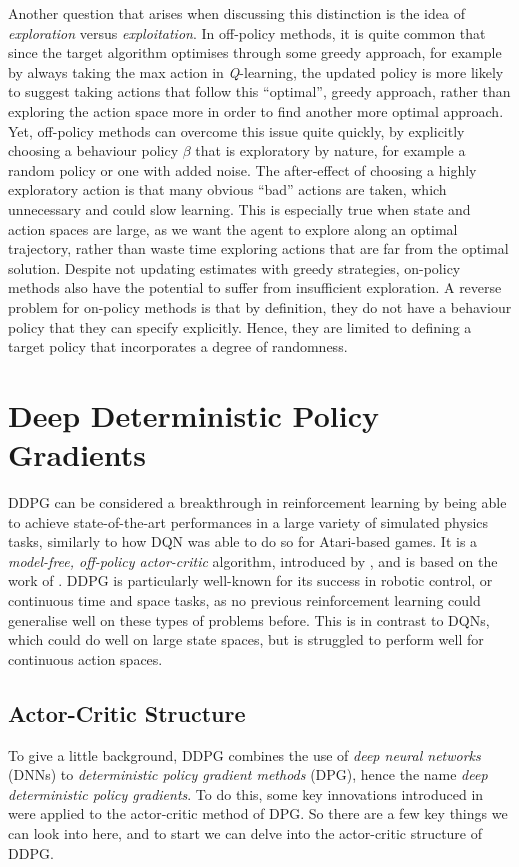 Another question that arises when discussing this distinction is the idea of \textit{exploration} versus \textit{exploitation}. In off-policy methods, it is quite common that since the target algorithm optimises through some greedy approach, for example by always taking the max action in \textit{Q}-learning, the updated policy is more likely to suggest taking actions that follow this ``optimal'', greedy approach, rather than exploring the action space more in order to find another more optimal approach. 
Yet, off-policy methods can overcome this issue quite quickly, by explicitly choosing a behaviour policy $\beta$ that is exploratory by nature, for example a random policy or one with added noise. The after-effect of choosing a highly exploratory action is that many obvious ``bad'' actions are taken, which unnecessary and could slow learning. This is especially true when state and action spaces are large, as we want the agent to explore along an optimal trajectory, rather than waste time exploring actions that are far from the optimal solution.
Despite not updating estimates with greedy strategies, on-policy methods also have the potential to suffer from insufficient exploration. A reverse problem for on-policy methods is that by definition, they do not have a behaviour policy that they can specify explicitly. Hence, they are limited to defining a target policy that incorporates a degree of randomness. 

\section{Deep Deterministic Policy Gradients}

DDPG can be considered a breakthrough in reinforcement learning by being able to achieve state-of-the-art performances in a large variety of simulated physics tasks, similarly to how DQN \cite{DQN} was able to do so for Atari-based games.
It is a \textit{model-free, off-policy actor-critic} algorithm, introduced by \cite{DDPG}, and is based on the work of \cite{DPG}. 
DDPG is particularly well-known for its success in robotic control, or continuous time and space tasks, as no previous reinforcement learning could generalise well on these types of problems before. This is in contrast to DQNs, which could do well on large state spaces, but is struggled to perform well for continuous action spaces. 

\subsection{Actor-Critic Structure}
\label{subsec:3_4_DDPGactorCritic}
To give a little background, DDPG combines the use of \textit{deep neural networks} (DNNs) to \textit{deterministic policy gradient methods} (DPG), hence the name \textit{deep deterministic policy gradients}. To do this, some key innovations introduced in \cite{DQN} were applied to the actor-critic method of DPG.
So there are a few key things we can look into here, and to start we can delve into the actor-critic structure of DDPG.

